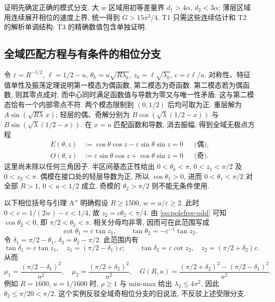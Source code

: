 \documentclass[UTF8]{ctexart}
\begin{document}
证明先确定正确的模式分支. 大 $w$ 区域用初等差量界 $d_1>4\alpha$, $d_2<3\alpha$;
薄层区域用连续展开相位的速度上界, 统一得到 $G>15\pi^2/4$.
T1 只需这些连续估计和 T2 的解析单调结构; T3 的精确数值包含单独证明.

\subsection{全域匹配方程与有条件的相位分支}\label{sec:global-phase}
令 $\varepsilon=R^{-1/2}$, $\ell=1/2-u$, $\theta_k=u\sqrt{R\lambda_k}$,
$z_k=\ell\sqrt{\lambda_k}$, $c=\varepsilon\ell/u$.
对称性、特征值单性及振荡定理说明第一模态为偶函数, 第二模态为奇函数.
第二模态若为偶函数, 则其零点成对, 而中心同时满足函数值与导数为零又与唯一性矛盾;
这与第二模态恰有一个内部零点不符. 两个模态限制到 $(0,1/2)$ 后均可取为正.
重层解为 $A\sin(\sqrt{R\lambda}\,x)$; 轻层的偶、奇解分别为
$B\cos(\sqrt\lambda(1/2-x))$ 与 $B\sin(\sqrt\lambda(1/2-x))$.
在 $x=u$ 匹配函数和导数, 消去振幅, 得到全域无极点方程
\begin{align}
 E(\theta,z)&:=\cos\theta\cos z-\varepsilon\sin\theta\sin z=0
 &&\text{(偶)},\label{eq:polefree-even}\\
 O(\theta,z)&:=\varepsilon\sin\theta\cos z+\cos\theta\sin z=0
 &&\text{(奇)}.\label{eq:polefree-odd}
\end{align}
这里尚未除以任何三角因子. 半区间基态正性给出
$0<\theta_k<\pi$, $0<z_1<\pi/2$ 及 $0<z_2<\pi$.
偶模在接口处的轻层导数为正, 所以 $\cos\theta_1>0$,
进而 $0<\theta_1<\pi/2$ 对全部 $R>1$, $0<u<1/2$ 成立.
奇模的 $\theta_2>\pi/2$ 则不能无条件使用.

以下相位括号与引理 A$''$ 明确假设 $R\ge1500$, $w=u/\varepsilon\ge2$.
此时 $0<c=1/(2w)-\varepsilon<1/4$, 故 $z_2=c\theta_2<\pi/4$.
由 \eqref{eq:polefree-odd} 可知 $\cos\theta_2<0$, 即
$\pi/2<\theta_2<\pi$. 相关分母均非零, 因而可在此范围写成
\begin{equation}
 \cot\theta_1=\varepsilon\tan z_1,\qquad
 \tan\theta_2=-\varepsilon^{-1}\tan z_2.\label{eq:secular}
\end{equation}
令 $\delta_1=\pi/2-\theta_1$, $\delta_2=\theta_2-\pi/2$. 此范围内有
\begin{equation}
 \tan\delta_1=\varepsilon\tan z_1,\quad
 z_1=(\pi/2-\delta_1)c;\qquad
 \tan\delta_2=\varepsilon\cot z_2,\quad
 z_2=(\pi/2+\delta_2)c.\label{eq:delta}
\end{equation}
从而
\begin{equation}
 \mu_1=\frac{(\pi/2-\delta_1)^2}{u^2},\quad
 \mu_2=\frac{(\pi/2+\delta_2)^2}{u^2},\quad
 G(R,u)=\frac{(\pi/2+\delta_2)^2-(\pi/2-\delta_1)^2}{u^2}.\label{eq:mu}
\end{equation}
例如 $R=1600$, $u=1/1600$ 时, $\rho\ge1$ 与 min-max 给出
$\lambda_2\le4\pi^2$, 因此 $\theta_2\le\pi/20<\pi/2$.
这个实例反驳全域奇相位分支的旧说法, 不反驳上述受限分支.
\end{document}
